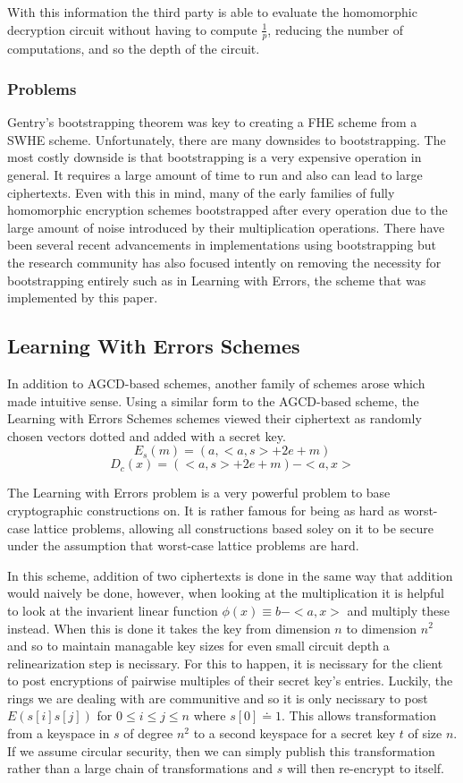 \documentclass[letterpaper,twocolumn,10pt]{article}
\begin{document}
With this information the third party is able to evaluate the homomorphic decryption circuit without having to compute $\frac{1}{p}$, reducing the number of computations, and so the depth of the circuit.

\subsubsection{Problems}
Gentry's bootstrapping theorem was key to creating a FHE scheme from a SWHE scheme. Unfortunately, there are many downsides to bootstrapping. The most costly downside is that bootstrapping is a very expensive operation in general. It requires a large amount of time to run\cite{ImplementingGentry} and also can lead to large ciphertexts. Even with this in mind, many of the early families of fully homomorphic encryption schemes bootstrapped after every operation due to the large amount of noise introduced by their multiplication operations. There have been several recent advancements in implementations using bootstrapping\cite{StehleSteinfeld, SmartVercauteren, ImplementingGentry, CNT} but the research community has also focused intently on removing the necessity for bootstrapping entirely such as in Learning with Errors, the scheme that was implemented by this paper.

\subsection{Learning With Errors Schemes}
\label{sec:lwe}
In addition to AGCD-based schemes, another family of schemes arose which made intuitive sense. Using a similar form to the AGCD-based scheme, the Learning with Errors Schemes\cite{SansBootstrapping} schemes viewed their ciphertext as randomly chosen vectors dotted and added with a secret key.
$$E_s(m) = (a, <a,s> + 2e + m)$$
$$D_c(x) = (<a,s> + 2e + m) - <a,x>$$

The Learning with Errors problem is a very powerful problem to base cryptographic constructions on. It is rather famous for being as hard as worst-case lattice problems, allowing all constructions based soley on it to be secure under the assumption that worst-case lattice problems are hard.

In this scheme, addition of two ciphertexts is done in the same way that addition would naively be done, however, when looking at the multiplication it is helpful to look at the invarient linear function $\phi(x) \equiv b - <a,x>$ and multiply these instead. When this is done it takes the key from dimension $n$ to dimension $n^2$ and so to maintain managable key sizes for even small circuit depth a relinearization step is necissary. For this to happen, it is necissary for the client to post encryptions of pairwise multiples of their secret key's entries. Luckily, the rings we are dealing with are communitive and so it is only necissary to post $E(s[i]s[j])$ for $0 \leq i \leq j \leq n$ where $s[0] \doteq 1$. This allows transformation from a keyspace in $s$ of degree $n^2$ to a second keyspace for a secret key $t$ of size $n$. If we assume circular security, then we can simply publish this transformation rather than a large chain of transformations and $s$ will then re-encrypt to itself.
\end{document}
